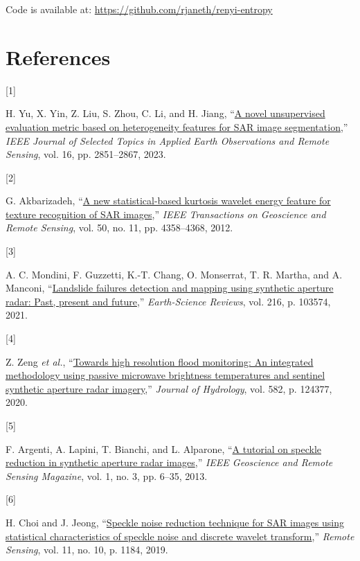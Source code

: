 \documentclass[
  journal,
]{IEEEtran}%
\newlength{\cslhangindent}
\newlength{\csllabelwidth}
\newenvironment{CSLReferences}[2] %
 {\begin{list}{}{%
  \setlength{\itemindent}{0pt}
  \setlength{\leftmargin}{0pt}
  \setlength{\parsep}{0pt}
  \ifodd #1
   \setlength{\leftmargin}{\cslhangindent}
   \setlength{\itemindent}{-1\cslhangindent}
  \fi
  \setlength{\itemsep}{#2\baselineskip}}}
 {\end{list}}
\newcommand{\CSLLeftMargin}[1]{\parbox[t]{\csllabelwidth}{\strut#1\strut}}
\newcommand{\CSLRightInline}[1]{\parbox[t]{\linewidth - \csllabelwidth}{\strut#1\strut}}
\begin{document}
Code is available at: \url{https://github.com/rjaneth/renyi-entropy}

\section*{References}\label{references}

\label{refs}
\begin{CSLReferences}{0}{0}
\CSLLeftMargin{{[}1{]} }%
\CSLRightInline{H. Yu, X. Yin, Z. Liu, S. Zhou, C. Li, and H. Jiang,
{``\href{https://doi.org/10.1109/jstars.2023.3257548}{A novel
unsupervised evaluation metric based on heterogeneity features for SAR
image segmentation},''} \emph{IEEE Journal of Selected Topics in Applied
Earth Observations and Remote Sensing}, vol. 16, pp. 2851--2867, 2023. }

\CSLLeftMargin{{[}2{]} }%
\CSLRightInline{G. Akbarizadeh,
{``\href{https://doi.org/10.1109/tgrs.2012.2194787}{A new
statistical-based kurtosis wavelet energy feature for texture
recognition of SAR images},''} \emph{IEEE Transactions on Geoscience and
Remote Sensing}, vol. 50, no. 11, pp. 4358--4368, 2012. }

\CSLLeftMargin{{[}3{]} }%
\CSLRightInline{A. C. Mondini, F. Guzzetti, K.-T. Chang, O. Monserrat,
T. R. Martha, and A. Manconi,
{``\href{https://doi.org/10.1016/j.earscirev.2021.103574}{Landslide
failures detection and mapping using synthetic aperture radar: Past,
present and future},''} \emph{Earth-Science Reviews}, vol. 216, p.
103574, 2021. }

\CSLLeftMargin{{[}4{]} }%
\CSLRightInline{Z. Zeng \emph{et al.},
{``\href{https://doi.org/10.1016/j.jhydrol.2019.124377}{Towards high
resolution flood monitoring: An integrated methodology using passive
microwave brightness temperatures and sentinel synthetic aperture radar
imagery},''} \emph{Journal of Hydrology}, vol. 582, p. 124377, 2020. }

\CSLLeftMargin{{[}5{]} }%
\CSLRightInline{F. Argenti, A. Lapini, T. Bianchi, and L. Alparone,
{``\href{https://doi.org/10.1109/mgrs.2013.2277512}{A tutorial on
speckle reduction in synthetic aperture radar images},''} \emph{IEEE
Geoscience and Remote Sensing Magazine}, vol. 1, no. 3, pp. 6--35, 2013.
}

\CSLLeftMargin{{[}6{]} }%
\CSLRightInline{H. Choi and J. Jeong,
{``\href{https://doi.org/10.3390/rs11101184}{Speckle noise reduction
technique for SAR images using statistical characteristics of speckle
noise and discrete wavelet transform},''} \emph{Remote Sensing}, vol.
11, no. 10, p. 1184, 2019. }


\end{CSLReferences}
\end{document}
